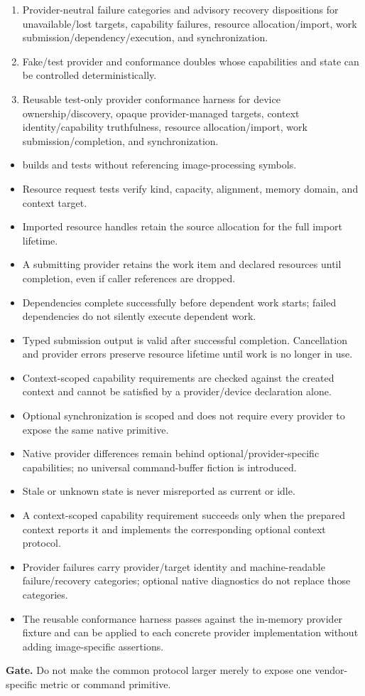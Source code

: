\begin{enumerate}
  \item Provider-neutral failure categories and advisory recovery dispositions for unavailable/lost targets, capability failures, resource allocation/import, work submission/dependency/execution, and synchronization.
  \item Fake/test provider and conformance doubles whose capabilities and state can be controlled deterministically.
  \item Reusable test-only provider conformance harness for device ownership/discovery, opaque provider-managed targets, context identity/capability truthfulness, resource allocation/import, work submission/completion, and synchronization.
\end{enumerate}

\exitcriteria
\begin{itemize}
  \item \GEP{} builds and tests without referencing image-processing symbols.
  \item Resource request tests verify kind, capacity, alignment, memory domain, and context target.
  \item Imported resource handles retain the source allocation for the full import lifetime.
  \item A submitting provider retains the work item and declared resources until completion, even if caller references are dropped.
  \item Dependencies complete successfully before dependent work starts; failed dependencies do not silently execute dependent work.
  \item Typed submission output is valid after successful completion. Cancellation and provider errors preserve resource lifetime until work is no longer in use.
  \item Context-scoped capability requirements are checked against the created context and cannot be satisfied by a provider/device declaration alone.
  \item Optional synchronization is scoped and does not require every provider to expose the same native primitive.
  \item Native provider differences remain behind optional/provider-specific capabilities; no universal command-buffer fiction is introduced.
  \item Stale or unknown state is never misreported as current or idle.
  \item A context-scoped capability requirement succeeds only when the prepared context reports it and implements the corresponding optional context protocol.
  \item Provider failures carry provider/target identity and machine-readable failure/recovery categories; optional native diagnostics do not replace those categories.
  \item The reusable conformance harness passes against the in-memory provider fixture and can be applied to each concrete provider implementation without adding image-specific assertions.
\end{itemize}

\textbf{Gate.} Do not make the common protocol larger merely to expose one vendor-specific metric or command primitive.